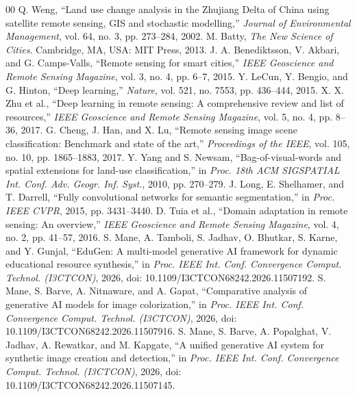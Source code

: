 \documentclass[conference]{IEEEtran}
\begin{document}
\begin{thebibliography}{00}
 Q. Weng, ``Land use change analysis in the Zhujiang Delta of China using satellite remote sensing, GIS and stochastic modelling,'' \textit{Journal of Environmental Management}, vol. 64, no. 3, pp. 273--284, 2002.
 M. Batty, \textit{The New Science of Cities}. Cambridge, MA, USA: MIT Press, 2013.
 J. A. Benediktsson, V. Akbari, and G. Camps-Valls, ``Remote sensing for smart cities,'' \textit{IEEE Geoscience and Remote Sensing Magazine}, vol. 3, no. 4, pp. 6--7, 2015.
 Y. LeCun, Y. Bengio, and G. Hinton, ``Deep learning,'' \textit{Nature}, vol. 521, no. 7553, pp. 436--444, 2015.
 X. X. Zhu et al., ``Deep learning in remote sensing: A comprehensive review and list of resources,'' \textit{IEEE Geoscience and Remote Sensing Magazine}, vol. 5, no. 4, pp. 8--36, 2017.
 G. Cheng, J. Han, and X. Lu, ``Remote sensing image scene classification: Benchmark and state of the art,'' \textit{Proceedings of the IEEE}, vol. 105, no. 10, pp. 1865--1883, 2017.
 Y. Yang and S. Newsam, ``Bag-of-visual-words and spatial extensions for land-use classification,'' in \textit{Proc. 18th ACM SIGSPATIAL Int. Conf. Adv. Geogr. Inf. Syst.}, 2010, pp. 270--279.
 J. Long, E. Shelhamer, and T. Darrell, ``Fully convolutional networks for semantic segmentation,'' in \textit{Proc. IEEE CVPR}, 2015, pp. 3431--3440.
 D. Tuia et al., ``Domain adaptation in remote sensing: An overview,'' \textit{IEEE Geoscience and Remote Sensing Magazine}, vol. 4, no. 2, pp. 41--57, 2016.
 S. Mane, A. Tamboli, S. Jadhav, O. Bhutkar, S. Karne, and Y. Gunjal, ``EduGen: A multi-model generative AI framework for dynamic educational resource synthesis,'' in \textit{Proc. IEEE Int. Conf. Convergence Comput. Technol. (I3CTCON)}, 2026, doi: 10.1109/I3CTCON68242.2026.11507192.
 S. Mane, S. Barve, A. Nitnaware, and A. Gapat, ``Comparative analysis of generative AI models for image colorization,'' in \textit{Proc. IEEE Int. Conf. Convergence Comput. Technol. (I3CTCON)}, 2026, doi: 10.1109/I3CTCON68242.2026.11507916.
 S. Mane, S. Barve, A. Popalghat, V. Jadhav, A. Rewatkar, and M. Kapgate, ``A unified generative AI system for synthetic image creation and detection,'' in \textit{Proc. IEEE Int. Conf. Convergence Comput. Technol. (I3CTCON)}, 2026, doi: 10.1109/I3CTCON68242.2026.11507145.

\end{thebibliography}
\end{document}
